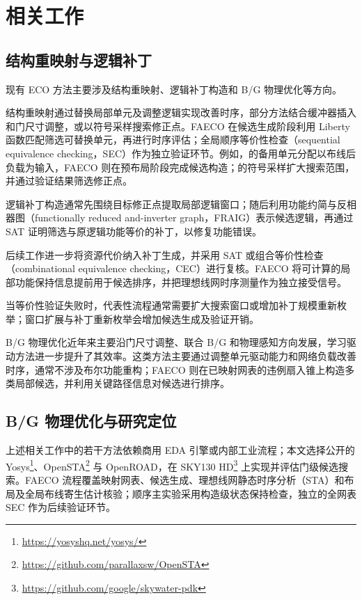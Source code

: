 \documentclass[twocolumn,10pt,fontset=windows]{ctexart}
\begin{document}
\section{相关工作}

\subsection{结构重映射与逻辑补丁}
现有 ECO 方法主要涉及结构重映射、逻辑补丁构造和 B/G 物理优化等方向。

结构重映射通过替换局部单元及调整逻辑实现改善时序，部分方法结合缓冲器插入和门尺寸调整\cite{ho2010eco}，或以符号采样搜索修正点\cite{kravets2019symbolic}。FAECO 在候选生成阶段利用 Liberty 函数匹配筛选可替换单元，再进行时序评估；全局顺序等价性检查（sequential equivalence checking，SEC）作为独立验证环节。例如，\cite{ho2010eco}的备用单元分配以布线后负载为输入，FAECO 则在预布局阶段完成候选构造；\cite{kravets2019symbolic}的符号采样扩大搜索范围，并通过验证结果筛选修正点。

逻辑补丁构造通常先围绕目标修正点提取局部逻辑窗口；随后利用功能约简与反相器图（functionally reduced and-inverter graph，FRAIG）表示候选逻辑，再通过 SAT 证明筛选与原逻辑功能等价的补丁，以修复功能错误\cite{jiang2010fraig,jiang2016resource}。

后续工作进一步将资源代价纳入补丁生成，并采用 SAT 或组合等价性检查（combinational equivalence checking，CEC）进行复核\cite{jiang2016resource,zhong2024stp}。FAECO 将可计算的局部功能保持信息提前用于候选排序，并把理想线网时序测量作为独立接受信号。

当等价性验证失败时，代表性流程通常需要扩大搜索窗口或增加补丁规模重新枚举\cite{zhuo2018patch}；窗口扩展与补丁重新枚举会增加候选生成及验证开销。

B/G 物理优化近年来主要沿门尺寸调整、联合 B/G 和物理感知方向发展\cite{liu2021rlsizer,huang2025phys,chen2024aito,zhang2025buffalo}，学习驱动方法\cite{chen2024aito,zhang2025buffalo}进一步提升了其效率。这类方法主要通过调整单元驱动能力和网络负载改善时序，通常不涉及布尔功能重构；FAECO 则在已映射网表的违例扇入锥上构造多类局部候选，并利用关键路径信息对候选进行排序。

\subsection{B/G 物理优化与研究定位}
上述相关工作中的若干方法依赖商用 EDA 引擎或内部工业流程；本文选择公开的 Yosys\footnote{\url{https://yosyshq.net/yosys/}}、OpenSTA\footnote{\url{https://github.com/parallaxsw/OpenSTA}} 与 OpenROAD\cite{openroad}，在 SKY130 HD\footnote{\url{https://github.com/google/skywater-pdk}} 上实现并评估门级候选搜索。FAECO 流程覆盖映射网表、候选生成、理想线网静态时序分析（STA）和布局及全局布线寄生估计核验；顺序主实验采用构造级状态保持检查，独立的全网表 SEC 作为后续验证环节。
\end{document}
